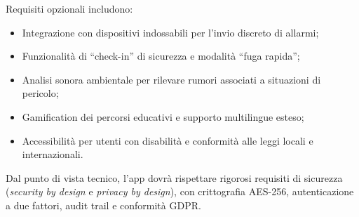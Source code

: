 \documentclass[a4paper,11pt]{article}
\begin{document}
Requisiti opzionali includono:
\begin{itemize}
    \item Integrazione con dispositivi indossabili per l’invio discreto di allarmi;
    \item Funzionalità di ``check-in'' di sicurezza e modalità ``fuga rapida'';
    \item Analisi sonora ambientale per rilevare rumori associati a situazioni di pericolo;
    \item Gamification dei percorsi educativi e supporto multilingue esteso;
    \item Accessibilità per utenti con disabilità e conformità alle leggi locali e internazionali.
\end{itemize}
Dal punto di vista tecnico, l’app dovrà rispettare rigorosi requisiti di sicurezza (\textit{security by design} e \textit{privacy by design}), con crittografia AES-256, autenticazione a due fattori, audit trail e conformità GDPR.
\end{document}
